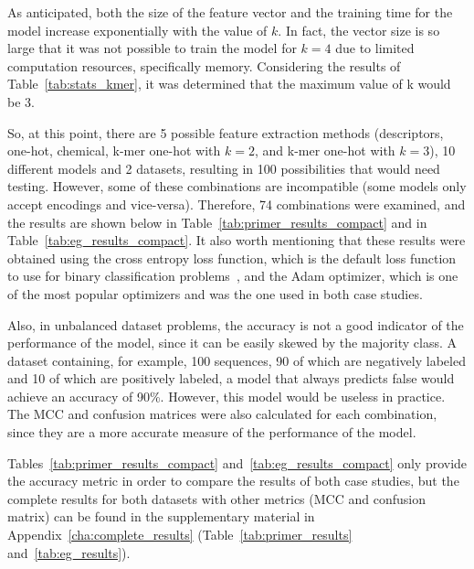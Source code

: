 As anticipated, both the size of the feature vector and the training time for the model increase exponentially with the value of $k$. In fact, the vector size is so large that it was not possible to train the model for $k=4$ due to limited computation resources, specifically memory. Considering the results of Table~\ref{tab:stats_kmer}, it was determined that the maximum value of k would be 3.

So, at this point, there are 5 possible feature extraction methods (descriptors, one-hot, chemical, k-mer one-hot with $k = 2$, and k-mer one-hot with $k = 3$), 10 different models and 2 datasets, resulting in 100 possibilities that would need testing. However, some of these combinations are incompatible (some models only accept encodings and vice-versa). Therefore, 74 combinations were examined, and the results are shown below in Table~\ref{tab:primer_results_compact} and in Table~\ref{tab:eg_results_compact}. It also worth mentioning that these results were obtained using the cross entropy loss function, which is the default loss function to use for binary classification problems~\cite{BrownleeHowNetworks}, and the Adam optimizer, which is one of the most popular optimizers and was the one used in both case studies. 

Also, in unbalanced dataset problems, the accuracy is not a good indicator of the performance of the model, since it can be easily skewed by the majority class. A dataset containing, for example, 100 sequences, 90 of which are negatively labeled and 10 of which are positively labeled, a model that always predicts false would achieve an accuracy of 90\%. However, this model would be useless in practice. The MCC and confusion matrices were also calculated for each combination, since they are a more accurate measure of the performance of the model. 

Tables~\ref{tab:primer_results_compact} and~\ref{tab:eg_results_compact} only provide the accuracy metric in order to compare the results of both case studies, but the complete results for both datasets with other metrics (MCC and confusion matrix) can be found in the supplementary material in Appendix~\ref{cha:complete_results} (Table~\ref{tab:primer_results} and~\ref{tab:eg_results}).

